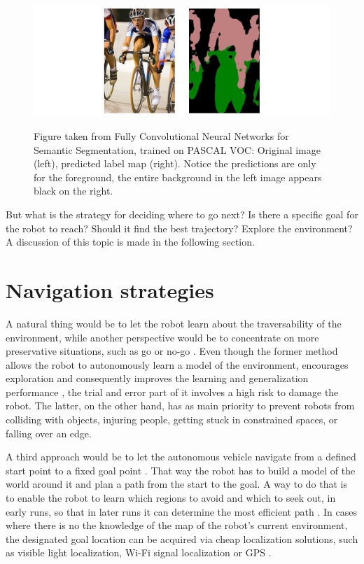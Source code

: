\documentclass[12pt,a4paper]{report}
\newcommand{\acronym}{\MakeUppercase}
\begin{document}
	\begin{figure}[h!]
		\caption{Figure taken from Fully Convolutional Neural Networks for Semantic 
		Segmentation, trained on \acronym{pascal voc}: Original image (left), predicted 
		label map (right). Notice the predictions are only for the foreground, the entire 
		background in the left image appears black on the right.}
		\centering
		\includegraphics[width=\textwidth]{fcn}
		\label{fig:fcn}
	\end{figure}
	
	
	But what is the strategy for deciding where to go next? Is there a specific goal 
	for the robot to reach? Should it find the best trajectory? Explore the 
	environment? A discussion of this topic is made in the following section.
	\\
	
	\section{Navigation strategies}
	\label{sec:bg:goals}
	
	A natural thing would be to let the robot learn about the traversability 
	of the environment, while another perspective would be to concentrate on more 
	preservative situations, such as go or no-go \citep{Hirose}. Even though the 
	former method allows the robot to autonomously learn a model of the environment,
	encourages exploration and consequently improves the learning and generalization 
	performance \citep{Zhelo}, the trial and error part of it involves a high risk to 
	damage the robot. The latter, on the other hand, has as main priority to prevent 
	robots from colliding with objects, injuring people, getting stuck in constrained 
	spaces, or falling over an edge. 
	\par
	A third approach would be to let the autonomous vehicle navigate from a defined 
	start point to a fixed goal	point \citep{Shneier, Zhelo}. That way the robot has 
	to build a model of the world around it and plan a path from the start to the 
	goal. A way to do that is to enable the robot to learn which regions to avoid 
	and which to seek out, in early runs, so that in later runs it can determine the 
	most efficient path \citep{Shneier}. In cases where there is no the knowledge of 
	the map of the robot's current environment, the designated goal location can be 
	acquired via cheap localization solutions, such as visible light localization, 
	Wi-Fi signal localization or \acronym{gps} \citep{Zhelo}.
	\\
	
\end{document}
